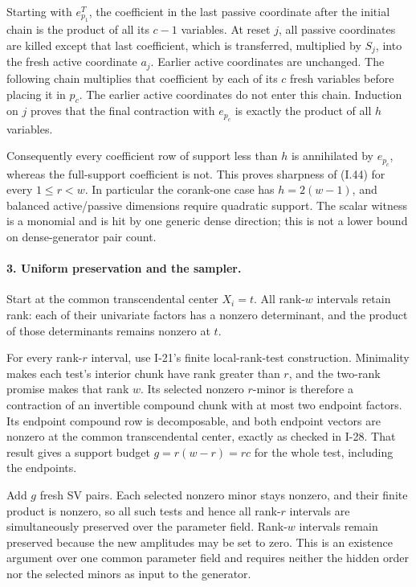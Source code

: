 Starting with $e_{p_1}^T$, the coefficient in the last
passive coordinate after the initial chain is the product
of all its $c-1$ variables.  At reset $j$, all passive
coordinates are killed except that last coefficient,
which is transferred, multiplied by $S_j$, into the
fresh active coordinate $a_j$.  Earlier active coordinates
are unchanged.  The following chain multiplies that
coefficient by each of its $c$ fresh variables before
placing it in $p_c$.  The earlier active coordinates
do not enter this chain.  Induction on $j$ proves that
the final contraction with $e_{p_c}$ is exactly the
product of all $h$ variables.

Consequently every coefficient row of support less than
$h$ is annihilated by $e_{p_c}$, whereas the full-support
coefficient is not.  This proves sharpness of (I.44) for
every $1\le r<w$.  In particular the corank-one case has
$h=2(w-1)$, and balanced active/passive dimensions require
quadratic support.  The scalar witness is a monomial and
is hit by one generic dense direction; this is not a
lower bound on dense-generator pair count.

\paragraph{3. Uniform preservation and the sampler.}
Start at the common transcendental center $X_i=t$.
All rank-$w$ intervals retain rank: each of their univariate
factors has a nonzero determinant, and the product of those
determinants remains nonzero at $t$.

For every rank-$r$ interval, use I-21's finite local-rank-test
construction.  Minimality makes each test's interior chunk
have rank greater than $r$, and the two-rank promise makes
that rank $w$.  Its selected nonzero $r$-minor is therefore
a contraction of an invertible compound chunk with at most
two endpoint factors.  Its endpoint compound row is
decomposable, and both endpoint vectors are nonzero at the
common transcendental center, exactly as checked in I-28.
That result gives a support budget $g=r(w-r)=rc$ for the
whole test, including the endpoints.

Add $g$ fresh SV pairs.  Each selected nonzero minor stays
nonzero, and their finite product is nonzero, so all such
tests and hence all rank-$r$ intervals are simultaneously
preserved over the parameter field.  Rank-$w$ intervals
remain preserved because the new amplitudes may be set to
zero.  This is an existence argument over one common
parameter field and requires neither the hidden order nor
the selected minors as input to the generator.

